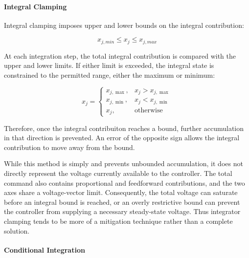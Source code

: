 \documentclass{article}
\begin{document}
\paragraph{Integral Clamping}

Integral clamping imposes upper and lower bounds on the integral contribution:

\begin{equation}
    x_{j,min} \leq x_j \leq x_{j,max}
\end{equation}

At each integration step, the total integral contribution is compared with the upper and lower limits. If either limit is exceeded, the integral state is constrained to the permitted range, either the maximum or minimum:

\begin{equation}
    x_j = 
    \begin{cases}
        x_{j,\max}, & x_j > x_{j,\max} \\
        x_{j,\min}, & x_j < x_{j,\min} \\
        x_j, & \text{otherwise}
    \end{cases}
\end{equation}

Therefore, once the integral contribuiton reaches a bound, further accumulation in that direction is prevented. An error of the opposite sign allows the integral contribution to move away from the bound.

While this method is simply and prevents unbounded accumulation, it does not directly represent the voltage currently available to the controller. The total command also contains proportional and feedforward contributions, and the two axes share a voltage-vector limit. Consequently, the total voltage can saturate before an integral bound is reached, or an overly restrictive bound can prevent the controller from supplying a necessary steady-state voltage. Thus integrator clamping tends to be more of a mitigation technique rather than a complete solution.


\paragraph{Conditional Integration}
\end{document}
